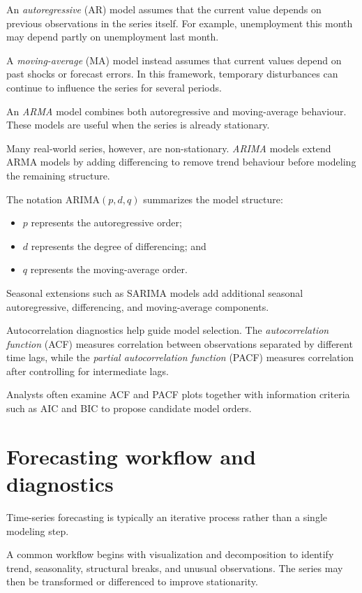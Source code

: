 \documentclass[
  11pt,
  oneside]{book}
\providecommand{\tightlist}{%
  \setlength{\itemsep}{0pt}\setlength{\parskip}{0pt}}
\begin{document}
An \emph{autoregressive} (AR) model assumes that the current value depends on previous observations in the series itself. For example, unemployment this month may depend partly on unemployment last month.

A \emph{moving-average} (MA) model instead assumes that current values depend on past shocks or forecast errors. In this framework, temporary disturbances can continue to influence the series for several periods.

An \emph{ARMA} model combines both autoregressive and moving-average behaviour. These models are useful when the series is already stationary.

Many real-world series, however, are non-stationary. \emph{ARIMA} models extend ARMA models by adding differencing to remove trend behaviour before modeling the remaining structure.

The notation ARIMA\((p,d,q)\) summarizes the model structure:

\begin{itemize}
\tightlist
\item
  \(p\) represents the autoregressive order;
\item
  \(d\) represents the degree of differencing; and
\item
  \(q\) represents the moving-average order.
\end{itemize}

Seasonal extensions such as SARIMA models add additional seasonal autoregressive, differencing, and moving-average components.

Autocorrelation diagnostics help guide model selection. The \emph{autocorrelation function} (ACF) measures correlation between observations separated by different time lags, while the \emph{partial autocorrelation function} (PACF) measures correlation after controlling for intermediate lags.

Analysts often examine ACF and PACF plots together with information criteria such as AIC and BIC to propose candidate model orders.

\section{Forecasting workflow and diagnostics}\label{forecasting-workflow-and-diagnostics}

Time-series forecasting is typically an iterative process rather than a single modeling step.

A common workflow begins with visualization and decomposition to identify trend, seasonality, structural breaks, and unusual observations. The series may then be transformed or differenced to improve stationarity.
\end{document}
